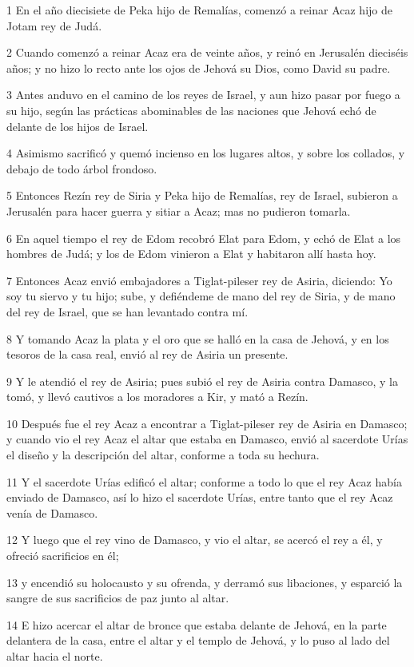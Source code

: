 \par 1 En el año diecisiete de Peka hijo de Remalías, comenzó a reinar Acaz hijo de Jotam rey de Judá.
\par 2 Cuando comenzó a reinar Acaz era de veinte años, y reinó en Jerusalén dieciséis años; y no hizo lo recto ante los ojos de Jehová su Dios, como David su padre.
\par 3 Antes anduvo en el camino de los reyes de Israel, y aun hizo pasar por fuego a su hijo, según las prácticas abominables de las naciones que Jehová echó de delante de los hijos de Israel. 
\par 4 Asimismo sacrificó y quemó incienso en los lugares altos, y sobre los collados, y debajo de todo árbol frondoso.
\par 5 Entonces Rezín rey de Siria y Peka hijo de Remalías, rey de Israel, subieron a Jerusalén para hacer guerra y sitiar a Acaz; mas no pudieron tomarla. 
\par 6 En aquel tiempo el rey de Edom recobró Elat para Edom, y echó de Elat a los hombres de Judá; y los de Edom vinieron a Elat y habitaron allí hasta hoy.
\par 7 Entonces Acaz envió embajadores a Tiglat-pileser rey de Asiria, diciendo: Yo soy tu siervo y tu hijo; sube, y defiéndeme de mano del rey de Siria, y de mano del rey de Israel, que se han levantado contra mí.
\par 8 Y tomando Acaz la plata y el oro que se halló en la casa de Jehová, y en los tesoros de la casa real, envió al rey de Asiria un presente.
\par 9 Y le atendió el rey de Asiria; pues subió el rey de Asiria contra Damasco, y la tomó, y llevó cautivos a los moradores a Kir, y mató a Rezín. 
\par 10 Después fue el rey Acaz a encontrar a Tiglat-pileser rey de Asiria en Damasco; y cuando vio el rey Acaz el altar que estaba en Damasco, envió al sacerdote Urías el diseño y la descripción del altar, conforme a toda su hechura.
\par 11 Y el sacerdote Urías edificó el altar; conforme a todo lo que el rey Acaz había enviado de Damasco, así lo hizo el sacerdote Urías, entre tanto que el rey Acaz venía de Damasco.
\par 12 Y luego que el rey vino de Damasco, y vio el altar, se acercó el rey a él, y ofreció sacrificios en él;
\par 13 y encendió su holocausto y su ofrenda, y derramó sus libaciones, y esparció la sangre de sus sacrificios de paz junto al altar.
\par 14 E hizo acercar el altar de bronce que estaba delante de Jehová, en la parte delantera de la casa, entre el altar y el templo de Jehová, y lo puso al lado del altar hacia el norte.
